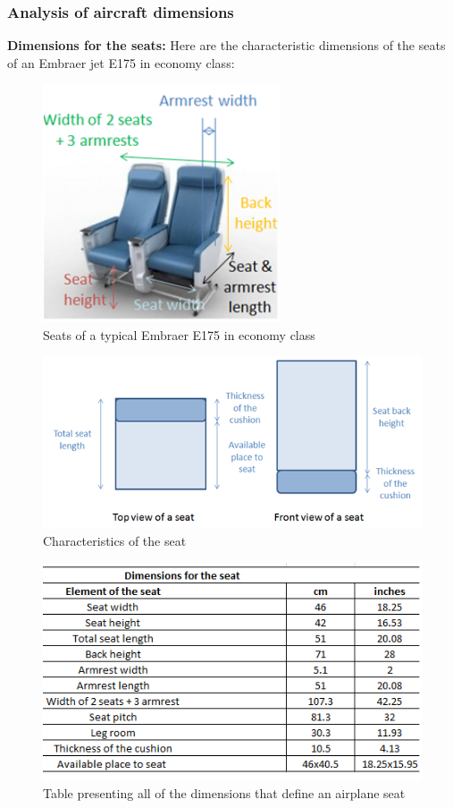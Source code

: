 \subsubsection*{Analysis of aircraft dimensions}
\textbf{Dimensions for the seats:}
Here are the characteristic dimensions of the seats of an Embraer jet E175 in economy class:
\begin{figure}[h]
\centering
\includegraphics[width=7cm]{images/seat_dimensions_image_global.png}
\caption{Seats of a typical Embraer E175 in economy class}
\label{fig:seat_dimensions_1}
\end{figure}

\begin{figure}[h]
\centering
\includegraphics[width=12cm]{images/seat_dimensions_image_topandfront_view.png}
\caption{Characteristics of the seat}
\label{fig: seat_dimensions_2}
\end{figure}

\begin{figure}[h]
\centering
\includegraphics[width=12cm]{images/seat_dimensions_table}
\caption{Table presenting all of the dimensions that define an airplane seat}
\label{fig: seat_dimensions_table}
\end{figure}

